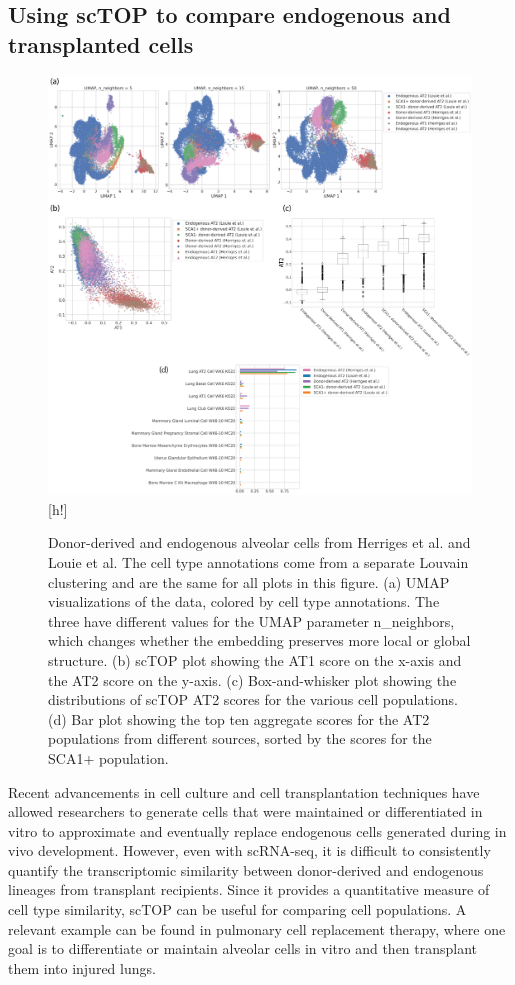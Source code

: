 \documentclass[aps,superscriptaddress, notitlepage,longbibliography]{revtex4-1}
\begin{document}
\subsection{Using scTOP to compare endogenous and transplanted cells}

\begin{figure}[h!]
	\centering
		\includegraphics[scale=0.83]{figs/engineered cells comparison.png}[h!]
	\caption{Donor-derived and endogenous alveolar cells from Herriges et al. and Louie et al. The cell type annotations come from a separate Louvain clustering and are the same for all plots in this figure. (a) UMAP visualizations of the data, colored by cell type annotations. The three have different values for the UMAP parameter n\_neighbors, which changes whether the embedding preserves more local or global structure. (b) scTOP plot showing the AT1 score on the x-axis and the AT2 score on the y-axis. (c) Box-and-whisker plot showing the distributions of scTOP AT2 scores for the various cell populations. (d) Bar plot showing the top ten aggregate scores for the AT2 populations from different sources, sorted by the scores for the SCA1+ population.}
	\label{engineered}
\end{figure}
Recent advancements in cell culture and cell transplantation techniques have allowed researchers to generate cells that were maintained or differentiated in vitro to approximate and eventually replace endogenous cells generated during in vivo development. However, even with scRNA-seq, it is difficult to consistently quantify the transcriptomic similarity between donor-derived and endogenous lineages from transplant recipients. Since it provides a quantitative measure of cell type similarity, scTOP can be useful for comparing cell populations. A relevant example can be found in pulmonary cell replacement therapy, where one goal is to differentiate or maintain alveolar cells in vitro and then transplant them into injured lungs. 
\end{document}
